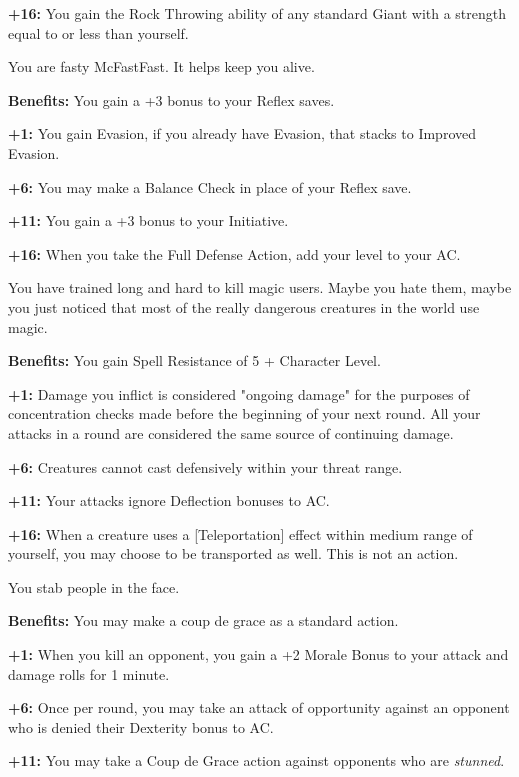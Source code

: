 \textbf{+16:} You gain the Rock Throwing ability of any standard Giant with a strength equal to or less than yourself.


You are fasty McFastFast. It helps keep you alive.

\textbf{Benefits:} You gain a +3 bonus to your Reflex saves.

\textbf{+1:} You gain Evasion, if you already have Evasion, that stacks to Improved Evasion.

\textbf{+6:} You may make a Balance Check in place of your Reflex save.

\textbf{+11:} You gain a +3 bonus to your Initiative.

\textbf{+16:} When you take the Full Defense Action, add your level to your AC.


You have trained long and hard to kill magic users. Maybe you hate them, maybe you just noticed that most of the really dangerous creatures in the world use magic.

\textbf{Benefits:} You gain Spell Resistance of 5 + Character Level.

\textbf{+1:} Damage you inflict is considered "ongoing damage" for the purposes of concentration checks made before the beginning of your next round. All your attacks in a round are considered the same source of continuing damage.

\textbf{+6:} Creatures cannot cast defensively within your threat range.

\textbf{+11:} Your attacks ignore Deflection bonuses to AC.

\textbf{+16:} When a creature uses a [Teleportation] effect within medium range of yourself, you may choose to be transported as well. This is not an action.


You stab people in the face.

\textbf{Benefits:} You may make a coup de grace as a standard action.

\textbf{+1:} When you kill an opponent, you gain a +2 Morale Bonus to your attack and damage rolls for 1 minute.

\textbf{+6:} Once per round, you may take an attack of opportunity against an opponent who is denied their Dexterity bonus to AC.

\textbf{+11:} You may take a Coup de Grace action against opponents who are \textit{stunned}.


